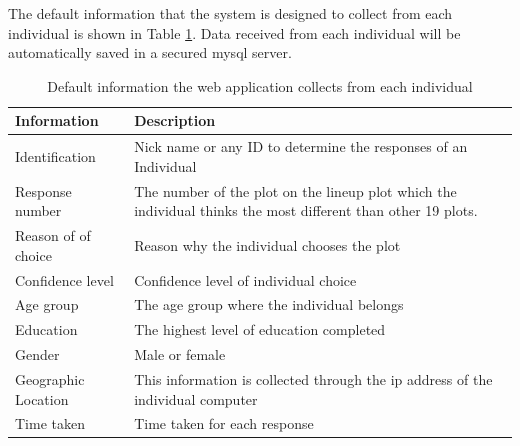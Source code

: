 \documentclass[11pt]{article}
\begin{document}


The default information that the system is designed to collect from each individual is shown in Table \ref{tbl:data_info}. Data received from each individual will be automatically saved in a secured mysql server. 

\begin{table}[hbtp]
\caption{Default information the web application collects from each individual}
\centering 
\begin{tabular}{lp{8cm}} 
\hline
Information &  Description \\ %
\hline
Identification & Nick name or any ID to determine the responses of an Individual \\
Response number & The number of the plot on the lineup plot which the individual thinks the most different than other 19 plots.\\ 
Reason of of choice & Reason why the individual chooses the plot \\
Confidence level & Confidence level of individual choice \\ 
Age group& The age group where the individual belongs \\
Education & The highest level of education completed \\
Gender & Male or female \\
Geographic Location & This information is collected through the ip address of the individual computer \\ 
Time taken & Time taken for each response\\
\hline
\end{tabular}
\label{tbl:data_info}
\end{table}	
\end{document}
